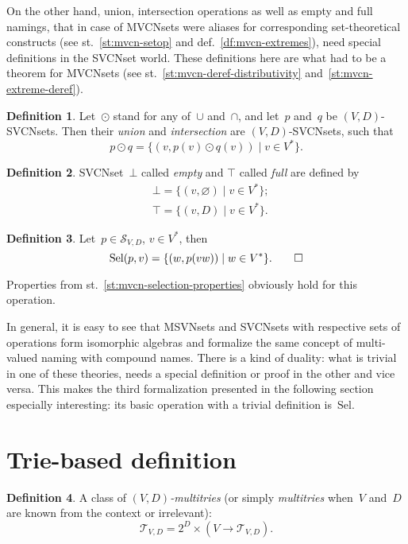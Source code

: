 \documentclass{article}
\theoremstyle{definition}
\newtheorem{Df}{Definition}
\newcommand{\setcharsvcn}{S}
\newcommand{\setcharmt}{T}
\newcommand{\setsymbol}[3]{\mathcal{#1}_{#2,#3}}
\newcommand{\setsvcn}[2]{\setsymbol{\setcharsvcn}{#1}{#2}}
\newcommand{\setmt}[2]{\setsymbol{\setcharmt}{#1}{#2}}
\newcommand{\select}{\mathrm{Sel}}
\begin{document}
On the other hand, union, intersection operations as well as empty and full
namings, that in case of MVCNsets were aliases for corresponding
set-theoretical constructs (see st.~\ref{st:mvcn-setop} and
def.~\ref{df:mvcn-extremes}), need special definitions in the SVCNset
world. These definitions here are what had to be a theorem for MVCNsets
(see st.~\ref{st:mvcn-deref-distributivity} and~\ref{st:mvcn-extreme-deref}).

\begin{Df}\label{df:union-intersection}
Let~$\odot$ stand for any of~$\cup$ and~$\cap$, and let~$p$ and~$q$ be
$(V,D)$-SVCNsets. Then their \emph{union} and \emph{intersection} are
$(V,D)$-SVCNsets, such that
\[
  p\odot q = \{ (v, p(v) \odot q(v)) \mid v\in V^\ast \} .
\]
\end{Df}

\begin{Df}\label{df:svcn-extremes}
SVCNset~$\bot$ called \emph{empty} and $\top$ called \emph{full} are defined by
\begin{eqnarray*}
  &  \bot = \{ (v, \varnothing) \mid v\in V^\ast \} ; \\
  &  \top = \{ (v, D) \mid v\in V^\ast \} .
\end{eqnarray*}
\end{Df}

\begin{Df}\label{df:svcn-select}
Let~$p\in\setsvcn{V}{D}$, $v\in V^\ast$, then
\[
  \select(p,v) = \{ (w, p(vw)) \mid w\in V^\ast \} .\qedhere
\]
\end{Df}

Properties from st.~\ref{st:mvcn-selection-properties} obviously hold for this
operation.

In general, it is easy to see that MSVNsets and SVCNsets with respective sets
of operations form isomorphic algebras and formalize the same concept of
multi-valued naming with compound names.
There is a kind of duality: what is trivial in one of these theories, needs a
special definition or proof in the other and vice versa. This makes the third
formalization presented in the following section especially interesting: its
basic operation with a trivial definition is~$\select$.


\section{Trie-based definition}

\begin{Df}\label{df:mt}
A class of \emph{$(V,D)$-multitries} (or simply \emph{multitries} when~$V$
and~$D$ are known from the context or irrelevant):
\[
  \setmt{V}{D} = 2^D \times (V \to \setmt{V}{D}) .
\]
\end{Df}
\end{document}
